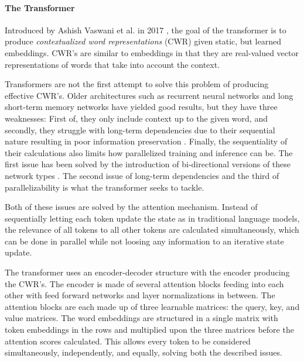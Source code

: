 \documentclass[main.tex]{subfiles}
\begin{document}

\paragraph{The Transformer}
Introduced by Ashish Vaswani et al. in 2017 \cite{vaswani2017att}, the goal of the transformer is to produce \emph{contextualized word representations} (CWR) given static, but learned embeddings.
CWR's are similar to embeddings in that they are real-valued vector representations of words that take into account the context.

Transformers are not the first attempt to solve this problem of producing effective CWR's.
Older architectures such as recurrent neural networks \cite[Ch. 10]{Goodfellow-et-al-2016} and long short-term memory networks \cite{hochreiter1997lstm} have yielded good results, but they have three weaknesses: First of, they only include context up to the given word, and secondly, they struggle with long-term dependencies due to their sequential nature resulting in poor information preservation \cite{Goodfellow-et-al-2016}.
Finally, the sequentiality of their calculations also limits how parallelized training and inference can be.
The first issue has been solved by the introduction of bi-directional versions of these network types \cite{schuster1997birnn}.
The second issue of long-term dependencies and the third of parallelizability is what the transformer seeks to tackle.

Both of these issues are solved by the attention mechanism.
Instead of sequentially letting each token update the state as in traditional language models, the relevance of all tokens to all other tokens are calculated simultaneously, which can be done in parallel while not loosing any information to an iterative state update.

The transformer uses an encoder-decoder structure with the encoder producing the CWR's.
The encoder is made of several attention blocks feeding into each other with feed forward networks and layer normalizations in between.
The attention blocks are each made up of three learnable matrices: the query, key, and value matrices.
The word embeddings are structured in a single matrix with token embeddings in the rows and multiplied upon the three matrices before the attention scores calculated.
This allows every token to be considered simultaneously, independently, and equally, solving both the described issues.
\cite{vaswani2017att}
\end{document}
